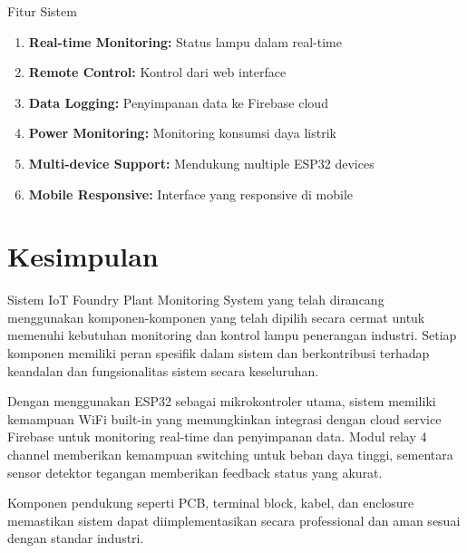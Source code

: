 \documentclass[12pt,a4paper]{article}
\begin{document}
\begin{funcbox}{Fitur Sistem}
\begin{enumerate}
\item \textbf{Real-time Monitoring:} Status lampu dalam real-time
\item \textbf{Remote Control:} Kontrol dari web interface
\item \textbf{Data Logging:} Penyimpanan data ke Firebase cloud
\item \textbf{Power Monitoring:} Monitoring konsumsi daya listrik
\item \textbf{Multi-device Support:} Mendukung multiple ESP32 devices
\item \textbf{Mobile Responsive:} Interface yang responsive di mobile
\end{enumerate}
\end{funcbox}

\section{Kesimpulan}

Sistem IoT Foundry Plant Monitoring System yang telah dirancang menggunakan komponen-komponen yang telah dipilih secara cermat untuk memenuhi kebutuhan monitoring dan kontrol lampu penerangan industri. Setiap komponen memiliki peran spesifik dalam sistem dan berkontribusi terhadap keandalan dan fungsionalitas sistem secara keseluruhan.

Dengan menggunakan ESP32 sebagai mikrokontroler utama, sistem memiliki kemampuan WiFi built-in yang memungkinkan integrasi dengan cloud service Firebase untuk monitoring real-time dan penyimpanan data. Modul relay 4 channel memberikan kemampuan switching untuk beban daya tinggi, sementara sensor detektor tegangan memberikan feedback status yang akurat.

Komponen pendukung seperti PCB, terminal block, kabel, dan enclosure memastikan sistem dapat diimplementasikan secara professional dan aman sesuai dengan standar industri.
\end{document}
